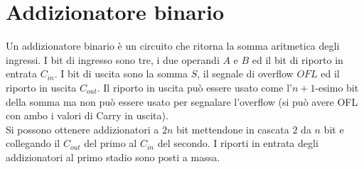 \documentclass{book}
\begin{document}
    \section{Addizionatore binario}
        Un addizionatore binario è un circuito che ritorna la somma aritmetica degli ingressi. I bit di ingresso sono tre, i due operandi $A$ e $B$ ed il bit di riporto in entrata $C_{in}$. I bit di uscita sono la somma $S$, il segnale di overflow $OFL$ ed il riporto in uscita $C_{out}$. Il riporto in uscita può essere usato come l'$n+1$-esimo bit della somma ma non può essere usato per segnalare l'overflow (si può avere OFL con ambo i valori di Carry in uscita). \\
        Si possono ottenere addizionatori a $2n$ bit mettendone in cascata $2$ da $n$ bit e collegando il $C_{out}$ del primo al $C_{in}$ del secondo. I riporti in entrata degli addizionatori al primo stadio sono posti a massa.
        
\end{document}
